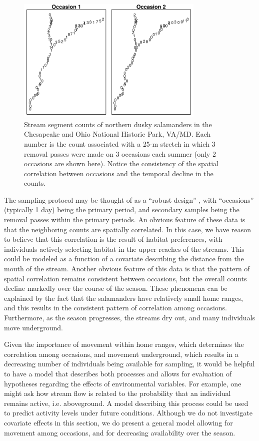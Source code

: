 \begin{figure}
  \centering
  \includegraphics[width=0.8\textwidth]{Ch18-Unmarked/figs/saln27}
  \caption{Stream segment counts of northern dusky salamanders
    in the Chesapeake and Ohio National Historic Park,
    VA/MD. Each number is the count associated with a 25-m stretch in which 3 removal passes
    were made on 3 occasions each summer (only 2 occasions are shown
    here). Notice the consistency of the spatial correlation between
    occasions and the temporal decline in the counts.}
  \label{unmarked.fig.salct}
\end{figure}


The sampling protocol may be
thought of as a ``robust design'' \citep{pollock:1982}, with
``occasions'' (typically 1 day) being the primary period, and
secondary samples being the removal passes within the primary
periods. An obvious feature of these data is that the neighboring
counts are spatially correlated. In this case, we have reason to
believe that this correlation is the result of habitat preferences,
with individuals actively selecting habitat in the upper reaches of
the streams. This could be modeled as a function of a covariate
describing the distance from the mouth of the stream. Another obvious
feature of this data is that the pattern of spatial correlation
remains consistent between occasions, but the overall counts decline
markedly over the course of the season.
These phenomena can be explained by the fact that the salamanders have
relatively small home ranges, and this results in the consistent pattern of
correlation  among occasions. Furthermore, as the season progresses, the
streams dry out, and many individuals move underground.

Given the importance of movement within home ranges, which determines
the correlation among occasions, and movement underground, which
results in a decreasing number of individuals being available for
sampling, it would be helpful to have a model that describes both
processes and allows for evaluation of hypotheses regarding the
effects of environmental variables. For example, one might ask how
stream flow is related to the probability that an individual remains
active, i.e. aboveground.
A model describing this process could be used to predict
activity levels under future conditions. Although we do not
investigate covariate effects in this section, we do present a general
model allowing for movement among occasions, and for decreasing
availability over the season.

